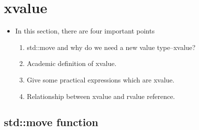 \documentclass[a4paper,11pt,twoside]{book}
\begin{document}
\section{xvalue}
\begin{itemize}
	\item In this section, there are four important points
	\begin{enumerate}
		\item std::move and why do we need a new value type--xvalue?
		\item Academic definition of xvalue.
		\item Give some practical expressions which are xvalue.
		\item Relationship between xvalue and rvalue reference.
		
	\end{enumerate}
\end{itemize}

\subsection{std::move function}
\end{document}
